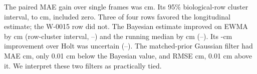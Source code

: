 \documentclass[review,12pt,authoryear]{elsarticle}
\begin{document}
The paired MAE gain over single frames was \TransferMAEGain{} cm. Its 95\% biological-row cluster interval, \TransferMAEGainLo{} to \TransferMAEGainHi{} cm, included zero. Three of four rows favored the longitudinal estimate; the W-0015 row did not. The Bayesian estimate improved on EWMA by \TransferEWMAGain{} cm (row-cluster interval, \TransferEWMAGainLo{}--\TransferEWMAGainHi{}) and the running median by \TransferMedianGain{} cm (\TransferMedianGainLo{}--\TransferMedianGainHi{}). Its \TransferHoltGain{}-cm improvement over Holt was uncertain (\TransferHoltGainLo{}--\TransferHoltGainHi{}). The matched-prior Gaussian filter had MAE \TransferGaussianMAE{} cm, only 0.01 cm below the Bayesian value, and RMSE \TransferGaussianRMSE{} cm, 0.01 cm above it. We interpret these two filters as practically tied.

\begin{table}[htbp]
\caption{Fixed prefix-causal estimators in the primary 2024 later-year, label-held-out validation. The Gaussian and particle filters use the same initial growth prior and process scales. Uncertainty resamples four biological rows rather than six camera views.}
\label{tab:performance}
\centering\small
{}
\end{table}
\end{document}
